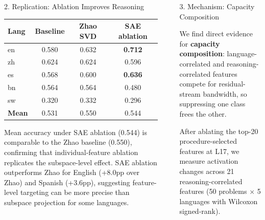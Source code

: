 \documentclass[final,20pt]{beamer}
\newlength{\sepwidth}
\newlength{\colwidth}
\newcommand{\separatorcolumn}{\begin{column}{\sepwidth}\end{column}}
\begin{document}
\begin{frame}[t]
\begin{columns}[t]
\begin{column}{\colwidth}
\begin{block}{2. Replication: Ablation Improves Reasoning}
    \begin{center}
    \renewcommand{\arraystretch}{1.15}
    \begin{tabular}{l c c c}
    \toprule
    \textbf{Lang} & \textbf{Baseline} & \textbf{Zhao SVD}
      & \textbf{SAE ablation} \\
    \midrule
    en & 0.580 & 0.632 & \textbf{0.712} \\
    zh & 0.624 & 0.624 & 0.596 \\
    es & 0.568 & 0.600 & \textbf{0.636} \\
    bn & 0.564 & 0.564 & 0.480 \\
    sw & 0.320 & 0.332 & 0.296 \\
    \midrule
    \textbf{Mean} & 0.531 & 0.550 & 0.544 \\
    \bottomrule
    \end{tabular}
    \end{center}

    Mean accuracy under SAE ablation (0.544) is comparable to the Zhao
    baseline (0.550), confirming that individual-feature ablation replicates
    the subspace-level effect.
    SAE ablation outperforms Zhao for English (+8.0pp over Zhao) and Spanish
    (+3.6pp), suggesting feature-level targeting can be more precise than
    subspace projection for some languages.

  \end{block}

\end{column}

\separatorcolumn

\begin{column}{\colwidth}

  \begin{alertblock}{3. Mechanism: Capacity Composition}

    We find direct evidence for \textbf{capacity composition}:
    language-correlated and reasoning-correlated features compete for
    residual-stream bandwidth, so suppressing one class frees the other.

    After ablating the top-20 procedure-selected features at L17, we measure
    activation changes across 21 reasoning-correlated features
    (50 problems $\times$ 5 languages with Wilcoxon signed-rank).


\end{alertblock}
\end{column}
\end{columns}
\end{frame}
\end{document}

